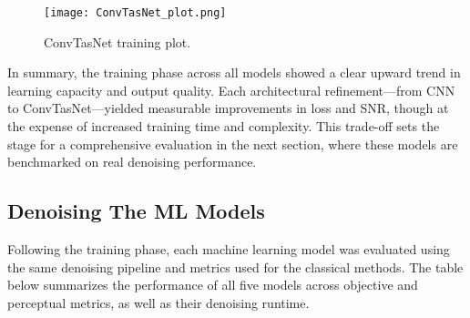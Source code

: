 \begin{figure}[H]
    \centering
    \texttt{[image: ConvTasNet\_plot.png]}
    \caption{\label{fig:convtasnet_training_plot} ConvTasNet training plot.}
\end{figure}

In summary, the training phase across all models showed a clear upward trend in learning capacity and output quality. Each architectural refinement—from CNN to ConvTasNet—yielded measurable improvements in loss and SNR, though at the expense of increased training time and complexity. This trade-off sets the stage for a comprehensive evaluation in the next section, where these models are benchmarked on real denoising performance.

\subsection{Denoising The ML Models}
\label{sec:denoising_ml_models}

Following the training phase, each machine learning model was evaluated using the same denoising pipeline and metrics used for the classical methods. The table below summarizes the performance of all five models across objective and perceptual metrics, as well as their denoising runtime.


